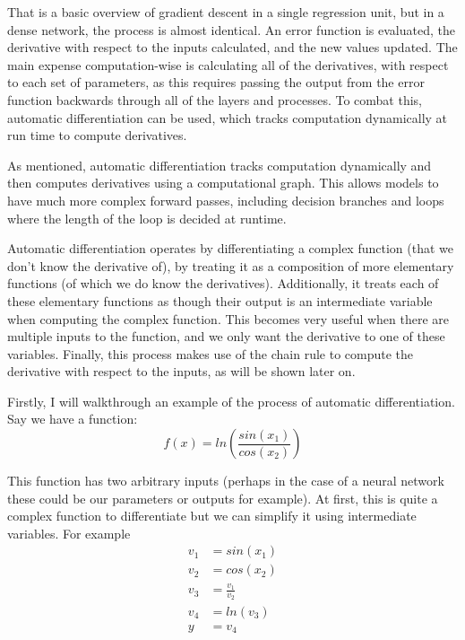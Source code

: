 \documentclass{article}
\makeatletter
\newcommand\subsubsubsection{\@startsection{paragraph}{4}{\z@}{-2.5ex\@plus -1ex \@minus -.25ex}{1.25ex \@plus .25ex}{\normalfont\normalsize\bfseries}}
\makeatother
\begin{document}
    That is a basic overview of gradient descent in a single regression unit, but in a dense network, the process is almost identical. An error function is evaluated, 
    the derivative with respect to the inputs calculated, and the new values updated. The main expense computation-wise is calculating all of the derivatives, with respect to
    each set of parameters, as this requires passing the output from the error function backwards through all of the layers and processes. To combat this, automatic differentiation
    can be used, which tracks computation dynamically at run time to compute derivatives.

    \subsubsubsection{Automatic Differentiation}
    As mentioned, automatic differentiation tracks computation dynamically and then computes derivatives using a computational graph. This allows models to
    have much more complex forward passes, including decision branches and loops where the length of the loop is decided at runtime.

    Automatic differentiation operates by differentiating a complex function (that we don't know the derivative of), by treating it as a composition of more elementary functions
    (of which we do know the derivatives). Additionally, it treats each of these elementary functions as though their output is an intermediate variable when computing the
    complex function. This becomes very useful when there are multiple inputs to the function, and we only want the derivative to one of these variables. Finally, this process
    makes use of the chain rule to compute the derivative with respect to the inputs, as will be shown later on.

    Firstly, I will walkthrough an example of the process of automatic differentiation.\\
    \noindent Say we have a function: \begin{displaymath}
        f(x) = ln\left(\frac{sin(x_1)}{cos(x_2)}\right)
    \end{displaymath}

    This function has two arbitrary inputs (perhaps in the case of a neural network these could be our parameters or outputs for example). At first, this is quite a complex
    function to differentiate but we can simplify it using intermediate variables. For example \begin{align}
        v_1 &= sin(x_1)\\
        v_2 &= cos(x_2)\\
        v_3 &= \frac{v_1}{v_2}\\
        v_4 &= ln(v_3)\\
        y &= v_4
    \end{align}
\end{document}
